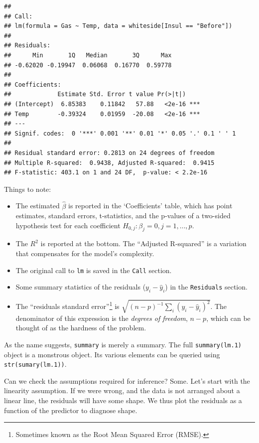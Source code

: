 \documentclass[]{book}
\providecommand{\tightlist}{%
  \setlength{\itemsep}{0pt}\setlength{\parskip}{0pt}}
\theoremstyle{definition}
\theoremstyle{definition}
\theoremstyle{definition}
\theoremstyle{remark}
\begin{document}
\begin{verbatim}
## 
## Call:
## lm(formula = Gas ~ Temp, data = whiteside[Insul == "Before"])
## 
## Residuals:
##      Min       1Q   Median       3Q      Max 
## -0.62020 -0.19947  0.06068  0.16770  0.59778 
## 
## Coefficients:
##             Estimate Std. Error t value Pr(>|t|)    
## (Intercept)  6.85383    0.11842   57.88   <2e-16 ***
## Temp        -0.39324    0.01959  -20.08   <2e-16 ***
## ---
## Signif. codes:  0 '***' 0.001 '**' 0.01 '*' 0.05 '.' 0.1 ' ' 1
## 
## Residual standard error: 0.2813 on 24 degrees of freedom
## Multiple R-squared:  0.9438, Adjusted R-squared:  0.9415 
## F-statistic: 403.1 on 1 and 24 DF,  p-value: < 2.2e-16
\end{verbatim}

Things to note:

\begin{itemize}
\tightlist
\item
  The estimated \(\hat \beta\) is reported in the `Coefficients' table, which has point estimates, standard errors, t-statistics, and the p-values of a two-sided hypothesis test for each coefficient \(H_{0,j}:\beta_j=0, j=1,\dots,p\).
\item
  The \(R^2\) is reported at the bottom. The ``Adjusted R-squared'' is a variation that compensates for the model's complexity.
\item
  The original call to \texttt{lm} is saved in the \texttt{Call} section.
\item
  Some summary statistics of the residuals (\(y_i-\hat y_i\)) in the \texttt{Residuals} section.
\item
  The ``residuals standard error''\footnote{Sometimes known as the Root Mean Squared Error (RMSE).} is \(\sqrt{(n-p)^{-1} \sum_i (y_i-\hat y_i)^2}\). The denominator of this expression is the \emph{degrees of freedom}, \(n-p\), which can be thought of as the hardness of the problem.
\end{itemize}

As the name suggests, \texttt{summary} is merely a summary. The full \texttt{summary(lm.1)} object is a monstrous object.
Its various elements can be queried using \texttt{str(sumary(lm.1))}.

Can we check the assumptions required for inference?
Some.
Let's start with the linearity assumption.
If we were wrong, and the data is not arranged about a linear line, the residuals will have some shape. We thus plot the residuals as a function of the predictor to diagnose shape.
\end{document}
